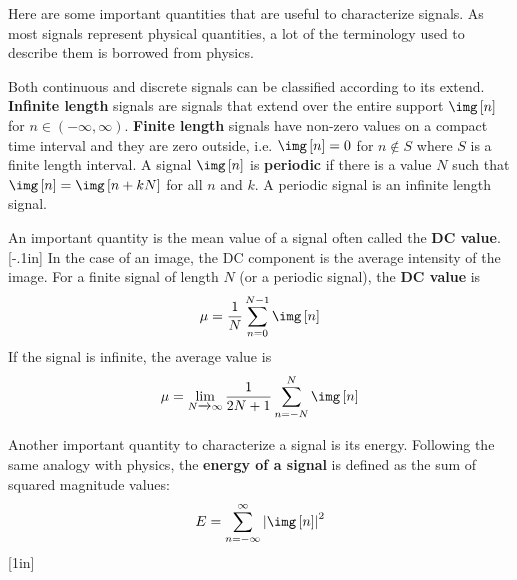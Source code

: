 Here are some important quantities that are useful to characterize signals. As most signals represent physical quantities, a lot of the terminology used to describe them is borrowed from physics.  

Both continuous and discrete signals can be classified according to its extend. {\bf Infinite length}
signals are signals that extend over the entire support $\img \left[n \right]$ for $n \in (-\infty, \infty)$. {\bf Finite length} 
signals have non-zero values on a compact time interval and they are zero outside, i.e. $\img \left[n \right] = 0$ for $n \notin S$ where $S$ is a finite length interval.
A signal $\img \left[n \right]$ is {\bf periodic} 
if there is a value $N$ such that $\img \left[n \right] = \img \left[n + k N\right]$ for all $n$ and $k$. A periodic signal is an infinite length signal. 


An important quantity is the mean value of a signal often called the {\bf DC value}.
[-.1in] 
In the case of an image, the DC component is the average intensity of the image. For a finite signal of length $N$ (or a periodic signal), the {\bf DC value} is
\begin{equation}
\mu = \frac{1}{N} \sum_{n=0}^{N-1} \img \left[n\right]
\end{equation}
If the signal is infinite, the average value is
\begin{equation}
\mu = \lim_{N \xrightarrow{} \infty} \frac{1}{2N+1} \sum_{n=-N}^{N} \img \left[n\right]
\end{equation}


Another important quantity to characterize a signal is its energy. Following the same analogy with physics, the {\bf energy of a signal}
is defined as the sum of squared magnitude values:
\begin{equation}
E = \sum_{n = -\infty}^{\infty} \left| \img  \left[n\right] \right| ^2 
\end{equation}
[1in]

